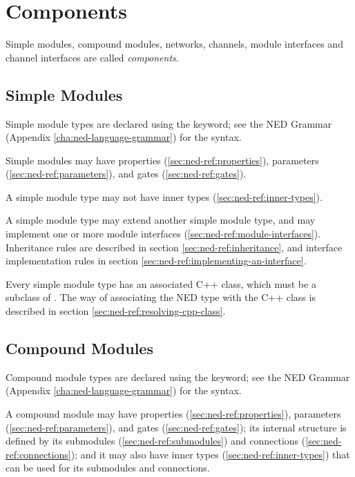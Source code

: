 \section{Components}
\label{sec:ned-ref:components}

Simple modules, compound modules, networks, channels, module interfaces
and channel interfaces are called \textit{components}.


\subsection{Simple Modules}
\label{sec:ned-ref:simple-modules}

Simple module types are declared using the  keyword;
see the NED Grammar (Appendix \ref{cha:ned-language-grammar}) for the
syntax.

Simple modules may have properties (\ref{sec:ned-ref:properties}),
parameters (\ref{sec:ned-ref:parameters}), and gates (\ref{sec:ned-ref:gates}).

A simple module type may not have inner types (\ref{sec:ned-ref:inner-types}).

A simple module type may extend another simple module type, and
may implement one or more module interfaces (\ref{sec:ned-ref:module-interfaces}).
Inheritance rules are described in section \ref{sec:ned-ref:inheritance},
and interface implementation rules in section \ref{sec:ned-ref:implementing-an-interface}.

Every simple module type has an associated C++ class, which must be
a subclass of . The way of associating the
NED type with the C++ class is described in section
\ref{sec:ned-ref:resolving-cpp-class}.



\subsection{Compound Modules}
\label{sec:ned-ref:compound-modules}

Compound module types are declared using the  keyword;
see the NED Grammar (Appendix \ref{cha:ned-language-grammar}) for the
syntax.

A compound module may have properties (\ref{sec:ned-ref:properties}),
parameters (\ref{sec:ned-ref:parameters}),
and gates (\ref{sec:ned-ref:gates}); its internal structure is defined by
its submodules (\ref{sec:ned-ref:submodules}) and
connections (\ref{sec:ned-ref:connections});
and it may also have inner types (\ref{sec:ned-ref:inner-types})
that can be used for its submodules and connections.

